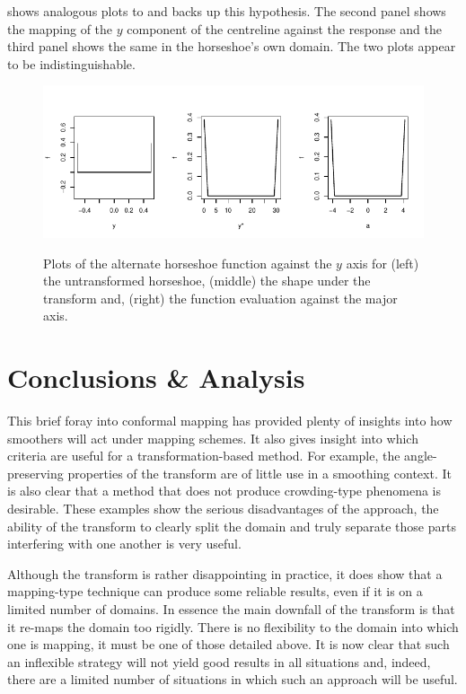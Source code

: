  shows analogous plots to  and backs up this hypothesis. The second panel shows the mapping of the $y$ component of the centreline against the response and the third panel shows the same in the horseshoe's own domain. The two plots appear to be indistinguishable.

\begin{figure}
\centering
\includegraphics[trim=0in 0in 0in 0in]{sc/figs/altcentrelinelineplots.pdf} \\
\caption{Plots of the alternate horseshoe function against the $y$ axis for (left) the untransformed horseshoe, (middle) the shape under the \sch transform and, (right) the function evaluation against the major axis.}
\label{altcentrelinelineplot}
\end{figure}



\section{Conclusions \& Analysis}

This brief foray into conformal mapping has provided plenty of insights into how smoothers will act under mapping schemes. It also gives insight into which criteria are useful for a transformation-based method. For example, the angle-preserving properties of the \sch transform are of little use in a smoothing context. It is also clear that a method that does not produce crowding-type phenomena is desirable. These examples show the serious disadvantages of the approach, the ability of the transform to clearly split the domain and truly separate those parts interfering with one another is very useful.

Although the \sch transform is rather disappointing in practice, it does show that a mapping-type technique can produce some reliable results, even if it is on a limited number of domains. In essence the main downfall of the \sch transform is that it re-maps the domain too rigidly. There is no flexibility to the domain into which one is mapping, it must be one of those detailed above. It is now clear that such an inflexible strategy will not yield good results in all situations and, indeed, there are a limited number of situations in which such an approach will be useful.

